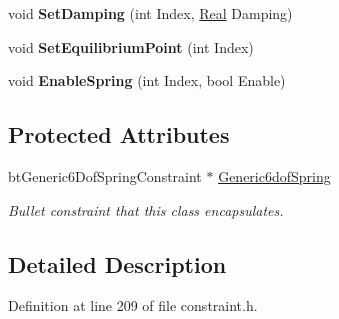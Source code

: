 \begin{DoxyCompactItemize}
\item 
\hypertarget{classphys_1_1Generic6DofSpringConstraint_a045ada78452b640730d93b1a55a07ed0}{
void {\bfseries SetDamping} (int Index, \hyperlink{namespacephys_af7eb897198d265b8e868f45240230d5f}{Real} Damping)}
\label{d1/dc7/classphys_1_1Generic6DofSpringConstraint_a045ada78452b640730d93b1a55a07ed0}

\item 
\hypertarget{classphys_1_1Generic6DofSpringConstraint_a2a7fac22f3e47671c66bfd0fea085544}{
void {\bfseries SetEquilibriumPoint} (int Index)}
\label{d1/dc7/classphys_1_1Generic6DofSpringConstraint_a2a7fac22f3e47671c66bfd0fea085544}

\item 
\hypertarget{classphys_1_1Generic6DofSpringConstraint_ad25cb82744be6045c53d41fe6fb33051}{
void {\bfseries EnableSpring} (int Index, bool Enable)}
\label{d1/dc7/classphys_1_1Generic6DofSpringConstraint_ad25cb82744be6045c53d41fe6fb33051}

\end{DoxyCompactItemize}
\subsection*{Protected Attributes}
\begin{DoxyCompactItemize}
\item 
\hypertarget{classphys_1_1Generic6DofSpringConstraint_aaa3b34568d2402155270c102e4719c07}{
btGeneric6DofSpringConstraint $\ast$ \hyperlink{classphys_1_1Generic6DofSpringConstraint_aaa3b34568d2402155270c102e4719c07}{Generic6dofSpring}}
\label{d1/dc7/classphys_1_1Generic6DofSpringConstraint_aaa3b34568d2402155270c102e4719c07}

\begin{DoxyCompactList}\small\item\em Bullet constraint that this class encapsulates. \item\end{DoxyCompactList}\end{DoxyCompactItemize}


\subsection{Detailed Description}


Definition at line 209 of file constraint.h.



